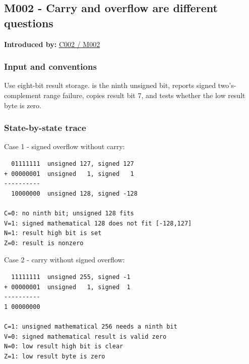 \subsection{M002 - Carry and overflow are different questions}\label{appendix-92ff77d4dfdc-m002---carry-and-overflow-are-different-questions}

\hypertarget{appendix-92ff77d4dfdc-m002---carry-and-overflow-are-different-questions}{}

\textbf{Introduced by:} \hyperref[01-foundations-i-ch001-arithmetic-becomes-a-policy]{C002 / M002}

\subsubsection{Input and conventions}\label{appendix-92ff77d4dfdc-input-and-conventions-1}

\hypertarget{appendix-92ff77d4dfdc-input-and-conventions-1}{}

Use eight-bit result storage.  is the ninth unsigned bit,  reports signed two's-complement range failure,  copies result bit 7, and  tests whether the low result byte is zero.

\subsubsection{State-by-state trace}\label{appendix-92ff77d4dfdc-state-by-state-trace-1}

\hypertarget{appendix-92ff77d4dfdc-state-by-state-trace-1}{}

Case 1 - signed overflow without carry:

\begin{verbatim}
  01111111  unsigned 127, signed 127
+ 00000001  unsigned   1, signed   1
----------
  10000000  unsigned 128, signed -128

C=0: no ninth bit; unsigned 128 fits
V=1: signed mathematical 128 does not fit [-128,127]
N=1: result high bit is set
Z=0: result is nonzero
\end{verbatim}

Case 2 - carry without signed overflow:

\begin{verbatim}
  11111111  unsigned 255, signed -1
+ 00000001  unsigned   1, signed  1
----------
1 00000000

C=1: unsigned mathematical 256 needs a ninth bit
V=0: signed mathematical result is valid zero
N=0: low result high bit is clear
Z=1: low result byte is zero
\end{verbatim}


